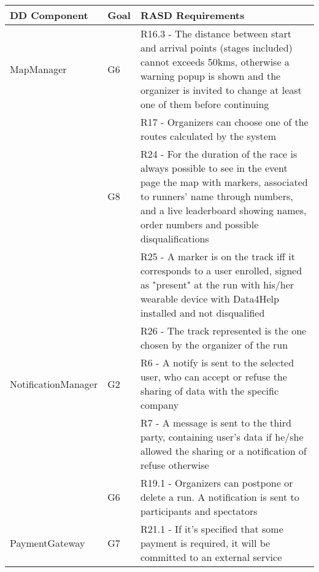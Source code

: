 \begin{table}[]
\begin{adjustbox}{width=\textwidth}
\begin{tabular}{|p{}|p{}|p{}|}
\hline
\textbf{DD Component} & \textbf{Goal} & \textbf{RASD Requirements}\\ \hline
MapManager			& G6	& R16.3 - The distance between start and arrival points (stages included) cannot exceeds 50kms, otherwise a warning popup is shown and the organizer is invited to change at least one of them before continuing\\
					&		& R17 - Organizers can choose one of the routes calculated by the system\\
					& G8	& R24 -	For the duration of the race is always possible to see in the event page the map with markers, associated to runners' name through numbers, and a live leaderboard showing names, order numbers and possible disqualifications\\
					&		& R25 -	A marker is on the track iff it corresponds to a user enrolled, signed as "present" at the run with his/her wearable device with Data4Help installed and not disqualified\\
					&		& R26 -	The track represented is the one chosen by the organizer of the run\\ \hline
NotificationManager	& G2	& R6 - A notify is sent to the selected user, who can accept or refuse the sharing of data with the specific company\\
					&		& R7 - A message is sent to the third party, containing user's data if he/she allowed the sharing or a notification of refuse otherwise\\
					& G6	& R19.1 - Organizers can postpone or delete a run. A notification is sent to participants and spectators\\ \hline
PaymentGateway		& G7	& R21.1	- If it's specified that some payment is required, it will be committed to an external service\\ \hline

\end{tabular}
\end{adjustbox}
\end{table}

%